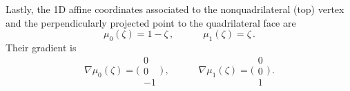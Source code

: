Lastly, the 1D affine coordinates associated to the nonquadrilateral (top) vertex and the perpendicularly projected point to the quadrilateral face are
\begin{equation}
		\mu_0(\zeta)=1-\zeta\,,\quad\qquad\mu_1(\zeta)=\zeta\,.
		\label{eq:PyramidZCoord}
\end{equation}
Their gradient is
\begin{equation}
		\nabla\mu_0(\zeta)=\bigg(\begin{smallmatrix}0\\[2pt]0\\[2pt]-1\end{smallmatrix}\bigg)\,,\quad\qquad
			\nabla\mu_1(\zeta)=\bigg(\begin{smallmatrix}0\\[2pt]0\\[2pt]1\end{smallmatrix}\bigg)\,.
		\label{eq:PyramidZCoordGrad}			
\end{equation}

